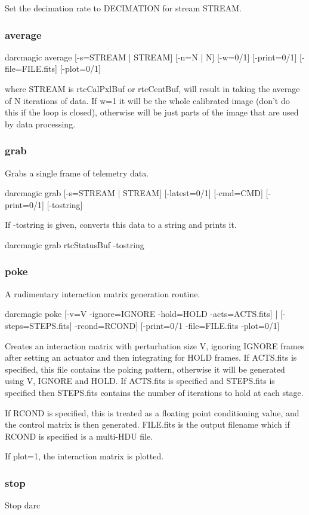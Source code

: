 \documentclass[a4,10pt]{article}
\begin{document}
Set the decimation rate to DECIMATION for stream STREAM.

\subsubsection{average}
darcmagic average [-s=STREAM | STREAM] [-n=N | N] [-w=0/1]
[-print=0/1] [-file=FILE.fits] [-plot=0/1]

where STREAM is rtcCalPxlBuf or rtcCentBuf, will result in taking the
average of N iterations of data.  If w=1 it will be the whole
calibrated image (don't do this if the loop is closed), otherwise will
be just parts of the image that are used by data processing.

\subsubsection{grab}
Grabs a single frame of telemetry data.

darcmagic grab [-s=STREAM | STREAM] [-latest=0/1] [-cmd=CMD]
[-print=0/1] [-tostring]

If -tostring is given, converts this data to a string and prints it.

darcmagic grab rtcStatusBuf -tostring

\subsubsection{poke}
A rudimentary interaction matrix generation routine.

darcmagic poke [-v=V -ignore=IGNORE -hold=HOLD -acts=ACTS.fits] |
[-steps=STEPS.fits]  -rcond=RCOND] [-print=0/1 -file=FILE.fits -plot=0/1]

Creates an interaction matrix with perturbation size V, ignoring
IGNORE frames after setting an actuator and then integrating for HOLD
frames.  If ACTS.fits is specified, this file contains the poking
pattern, otherwise it will be generated using V, IGNORE and HOLD.  If
ACTS.fits is specified and STEPS.fits is specified then STEPS.fits
contains the number of iterations to hold at each stage.

If RCOND is specified, this is treated as a floating point
conditioning value, and the control matrix is then generated.
FILE.fits is the output filename which if RCOND is specified is a
multi-HDU file.

If plot=1, the interaction matrix is plotted.

\subsubsection{stop}
Stop darc
\end{document}
